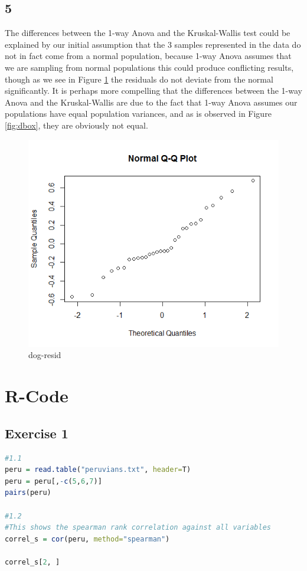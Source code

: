 \documentclass{article}
\begin{document}
    \subsection*{5}
    The differences between the 1-way Anova and the Kruskal-Wallis test could be explained by our initial assumption that the 3 samples represented in the data do not in fact come from a normal population, because 1-way Anova assumes that we are sampling from normal populations this could produce conflicting results, though as we see in Figure \ref{fig:dog-resid} the residuals do not deviate from the normal significantly.
    It is perhaps more compelling that the differences between the 1-way Anova and the Kruskal-Wallis are due to the fact that 1-way Anova assumes our populations have equal population variances, and as is observed in Figure \ref{fig:dbox}, they are obviously not equal.
    \begin{figure}[!htb]
    \centering
      \includegraphics[scale=0.4]{../results/4_5.png}
      \caption{dog-resid}
      \label{fig:dog-resid}
    \end{figure}
    
    \section{R-Code}
    \subsection{Exercise 1}\label{sec:RE1}
      \begin{lstlisting}[language=R]
      #1.1
peru = read.table("peruvians.txt", header=T)
peru = peru[,-c(5,6,7)]
pairs(peru)

#1.2
#This shows the spearman rank correlation against all variables
correl_s = cor(peru, method="spearman")

correl_s[2, ]
      \end{lstlisting}
\end{document}
